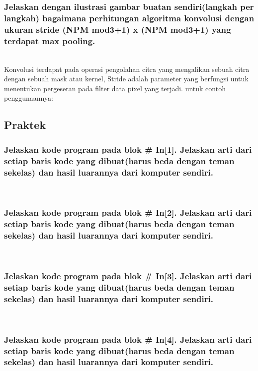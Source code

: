	\subsubsection{Jelaskan dengan ilustrasi gambar buatan sendiri(langkah per langkah) bagaimana perhitungan algoritma konvolusi dengan ukuran stride (NPM mod3+1) x (NPM mod3+1) yang terdapat max pooling.}
	\hfill\\
Konvolusi terdapat pada operasi pengolahan citra yang mengalikan sebuah citra dengan sebuah mask atau kernel, Stride adalah parameter yang berfungsi untuk menentukan pergeseran pada filter data pixel yang terjadi. untuk contoh penggunaannya:

	
\subsection{Praktek}
 
	\subsubsection{Jelaskan kode program pada blok \# In[1]. Jelaskan arti dari setiap baris kode yang dibuat(harus beda dengan teman sekelas) dan hasil luarannya dari komputer sendiri.}
	\hfill\\
	
 
	\subsubsection{Jelaskan kode program pada blok \# In[2]. Jelaskan arti dari setiap baris kode yang dibuat(harus beda dengan teman sekelas) dan hasil luarannya dari komputer sendiri.}
	\hfill\\

 
\subsubsection{Jelaskan kode program pada blok \# In[3]. Jelaskan arti dari setiap baris kode yang dibuat(harus beda dengan teman sekelas) dan hasil luarannya dari komputer sendiri.}
	\hfill\\
 
\subsubsection{Jelaskan kode program pada blok \# In[4]. Jelaskan arti dari setiap baris kode yang dibuat(harus beda dengan teman sekelas) dan hasil luarannya dari komputer sendiri.}
	\hfill\\
	
